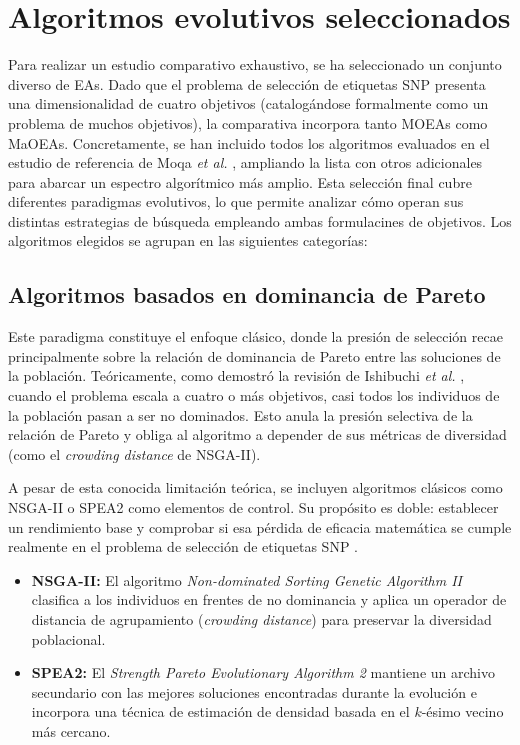 \section{Algoritmos evolutivos seleccionados}

Para realizar un estudio comparativo exhaustivo, se ha seleccionado un conjunto diverso de EAs. Dado que el problema de selección de etiquetas SNP presenta una dimensionalidad de cuatro objetivos (catalogándose formalmente como un problema de muchos objetivos), la comparativa incorpora tanto MOEAs como MaOEAs. Concretamente, se han incluido todos los algoritmos evaluados en el estudio de referencia de Moqa \textit{et al.} \cite{moqa2022assessing}, ampliando la lista con otros adicionales para abarcar un espectro algorítmico más amplio. Esta selección final cubre diferentes paradigmas evolutivos, lo que permite analizar cómo operan sus distintas estrategias de búsqueda empleando ambas formulacines de objetivos. Los algoritmos elegidos se agrupan en las siguientes categorías:

\subsection{Algoritmos basados en dominancia de Pareto}
Este paradigma constituye el enfoque clásico, donde la presión de selección recae principalmente sobre la relación de dominancia de Pareto entre las soluciones de la población. Teóricamente, como demostró la revisión de Ishibuchi \textit{et al.} \cite{ishibuchi2008evolutionary}, cuando el problema escala a cuatro o más objetivos, casi todos los individuos de la población pasan a ser no dominados. Esto anula la presión selectiva de la relación de Pareto y obliga al algoritmo a depender de sus métricas de diversidad (como el \textit{crowding distance} de NSGA-II). 

A pesar de esta conocida limitación teórica, se incluyen algoritmos clásicos como NSGA-II o SPEA2 como elementos de control. Su propósito es doble: establecer un rendimiento base y comprobar si esa pérdida de eficacia matemática se cumple realmente en el problema de selección de etiquetas SNP \cite{ting2010multi, moqa2022assessing}.
\begin{itemize}
    \item \textbf{NSGA-II:} El algoritmo \textit{Non-dominated Sorting Genetic Algorithm II} \cite{deb2002fast} clasifica a los individuos en frentes de no dominancia y aplica un operador de distancia de agrupamiento (\textit{crowding distance}) para preservar la diversidad poblacional.
    \item \textbf{SPEA2:} El \textit{Strength Pareto Evolutionary Algorithm 2} \cite{zitzler2001spea2} mantiene un archivo secundario con las mejores soluciones encontradas durante la evolución e incorpora una técnica de estimación de densidad basada en el $k$-ésimo vecino más cercano.
\end{itemize}

